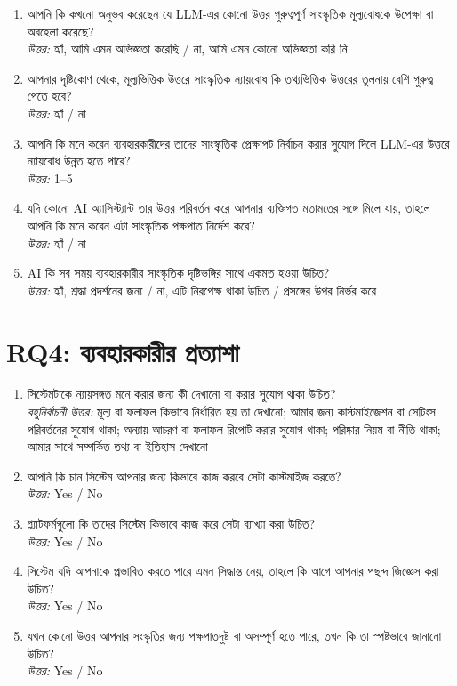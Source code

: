 \documentclass[11pt]{article}
\newcommand{\bn}[1]{{\bengalifont\upshape #1}}
\begin{document}
\begin{enumerate}
\item \bn{আপনি কি কখনো অনুভব করেছেন যে LLM-এর কোনো উত্তর গুরুত্বপূর্ণ সাংস্কৃতিক মূল্যবোধকে উপেক্ষা বা অবহেলা করেছে?}\\
\emph{\bn{উত্তর:}} \bn{হ্যাঁ, আমি এমন অভিজ্ঞতা করেছি / না, আমি এমন কোনো অভিজ্ঞতা করি নি}
\item \bn{আপনার দৃষ্টিকোণ থেকে, মূল্যভিত্তিক উত্তরে সাংস্কৃতিক ন্যায়বোধ কি তথ্যভিত্তিক উত্তরের তুলনায় বেশি গুরুত্ব পেতে হবে?}\\
\emph{\bn{উত্তর:}} \bn{হ্যাঁ / না}
\item \bn{আপনি কি মনে করেন ব্যবহারকারীদের তাদের সাংস্কৃতিক প্রেক্ষাপট নির্বাচন করার সুযোগ দিলে LLM-এর উত্তরে ন্যায়বোধ উন্নত হতে পারে?}\\
\emph{\bn{উত্তর:}} 1--5
\item \bn{যদি কোনো AI অ্যাসিস্ট্যান্ট তার উত্তর পরিবর্তন করে আপনার ব্যক্তিগত মতামতের সঙ্গে মিলে যায়, তাহলে আপনি কি মনে করেন এটা সাংস্কৃতিক পক্ষপাত নির্দেশ করে?}\\
\emph{\bn{উত্তর:}} \bn{হ্যাঁ / না}
\item \bn{AI কি সব সময় ব্যবহারকারীর সাংস্কৃতিক দৃষ্টিভঙ্গির সাথে একমত হওয়া উচিত?}\\
\emph{\bn{উত্তর:}} \bn{হ্যাঁ, শ্রদ্ধা প্রদর্শনের জন্য / না, এটি নিরপেক্ষ থাকা উচিত / প্রসঙ্গের উপর নির্ভর করে}
\end{enumerate}

\section*{RQ4: \bn{ব্যবহারকারীর প্রত্যাশা}}
\begin{enumerate}
\item \bn{সিস্টেমটাকে ন্যায়সঙ্গত মনে করার জন্য কী দেখানো বা করার সুযোগ থাকা উচিত?}\\
\emph{\bn{বহুনির্বাচনী উত্তর:}} \bn{মূল্য বা ফলাফল কিভাবে নির্ধারিত হয় তা দেখানো; আমার জন্য কাস্টমাইজেশন বা সেটিংস পরিবর্তনের সুযোগ থাকা; অন্যায় আচরণ বা ফলাফল রিপোর্ট করার সুযোগ থাকা; পরিষ্কার নিয়ম বা নীতি থাকা; আমার সাথে সম্পর্কিত তথ্য বা ইতিহাস দেখানো}
\item \bn{আপনি কি চান সিস্টেম আপনার জন্য কিভাবে কাজ করবে সেটা কাস্টমাইজ করতে?}\\
\emph{\bn{উত্তর:}} Yes / No
\item \bn{প্ল্যাটফর্মগুলো কি তাদের সিস্টেম কিভাবে কাজ করে সেটা ব্যাখ্যা করা উচিত?}\\
\emph{\bn{উত্তর:}} Yes / No
\item \bn{সিস্টেম যদি আপনাকে প্রভাবিত করতে পারে এমন সিদ্ধান্ত নেয়, তাহলে কি আগে আপনার পছন্দ জিজ্ঞেস করা উচিত?}\\
\emph{\bn{উত্তর:}} Yes / No
\item \bn{যখন কোনো উত্তর আপনার সংস্কৃতির জন্য পক্ষপাতদুষ্ট বা অসম্পূর্ণ হতে পারে, তখন কি তা স্পষ্টভাবে জানানো উচিত?}\\
\emph{\bn{উত্তর:}} Yes / No
\end{enumerate}
\end{document}
